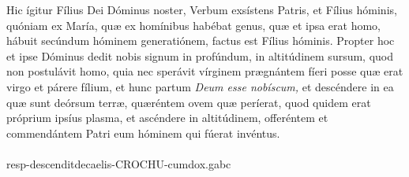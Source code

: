 \documentclass[options]{article}
\begin{document}
Hic ígitur Fílius Dei Dóminus noster, Verbum exsístens Patris, et Fílius hóminis, quóniam ex María, quæ ex homínibus habébat genus, quæ et ipsa erat homo, hábuit secúndum hóminem generatiónem, factus est Fílius hóminis. Propter hoc et ipse Dóminus dedit nobis signum in profúndum, in altitúdinem sursum, quod non postulávit homo, quia nec sperávit vírginem prægnántem fíeri posse quæ erat virgo et párere fílium, et hunc partum \emph{Deum esse nobíscum,} et descéndere in ea quæ sunt deórsum terræ, quæréntem ovem quæ períerat, quod quidem erat próprium ipsíus plasma, et ascéndere in altitúdinem, offeréntem et commendántem Patri eum hóminem qui fúerat invéntus.\\
\\
resp-descenditdecaelis-CROCHU-cumdox.gabc
\end{document}
